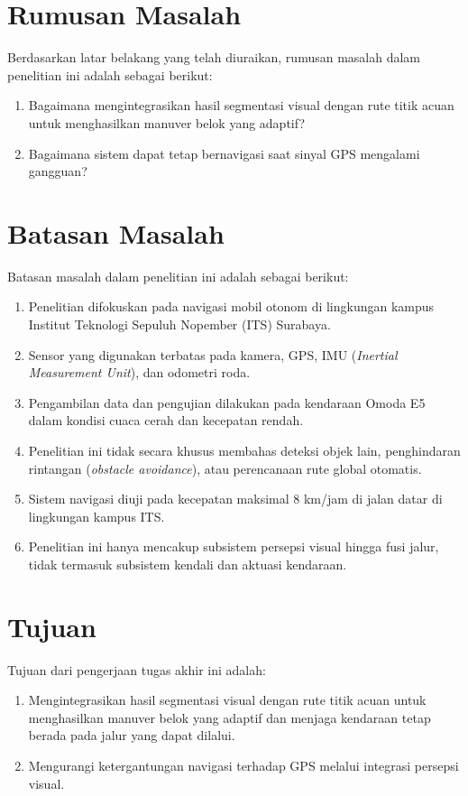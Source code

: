 \section{Rumusan Masalah}
\label{sec:rumusanmasalah}

Berdasarkan latar belakang yang telah diuraikan, rumusan masalah dalam penelitian ini adalah sebagai berikut:
\begin{enumerate}
  \item Bagaimana mengintegrasikan hasil segmentasi visual dengan rute titik acuan untuk menghasilkan manuver belok yang adaptif?
  \item Bagaimana sistem dapat tetap bernavigasi saat sinyal GPS mengalami gangguan?
\end{enumerate}

\section{Batasan Masalah}
\label{sec:batasanmasalah}

Batasan masalah dalam penelitian ini adalah sebagai berikut:
\begin{enumerate}
  \item Penelitian difokuskan pada navigasi mobil otonom di lingkungan kampus Institut Teknologi Sepuluh Nopember (ITS) Surabaya.
  \item Sensor yang digunakan terbatas pada kamera, GPS, IMU (\emph{Inertial Measurement Unit}), dan odometri roda.
  \item Pengambilan data dan pengujian dilakukan pada kendaraan Omoda E5 dalam kondisi cuaca cerah dan kecepatan rendah.
  \item Penelitian ini tidak secara khusus membahas deteksi objek lain, penghindaran rintangan (\emph{obstacle avoidance}), atau perencanaan rute global otomatis.
  \item Sistem navigasi diuji pada kecepatan maksimal 8 km/jam di jalan datar di lingkungan kampus ITS.
  \item Penelitian ini hanya mencakup subsistem persepsi visual hingga fusi jalur, tidak termasuk subsistem kendali dan aktuasi kendaraan.
\end{enumerate}

\section{Tujuan}
\label{sec:tujuan}

Tujuan dari pengerjaan tugas akhir ini adalah:
\begin{enumerate}
  \item Mengintegrasikan hasil segmentasi visual dengan rute titik acuan untuk menghasilkan manuver belok yang adaptif dan menjaga kendaraan tetap berada pada jalur yang dapat dilalui.
  \item Mengurangi ketergantungan navigasi terhadap GPS melalui integrasi persepsi visual.
\end{enumerate}

